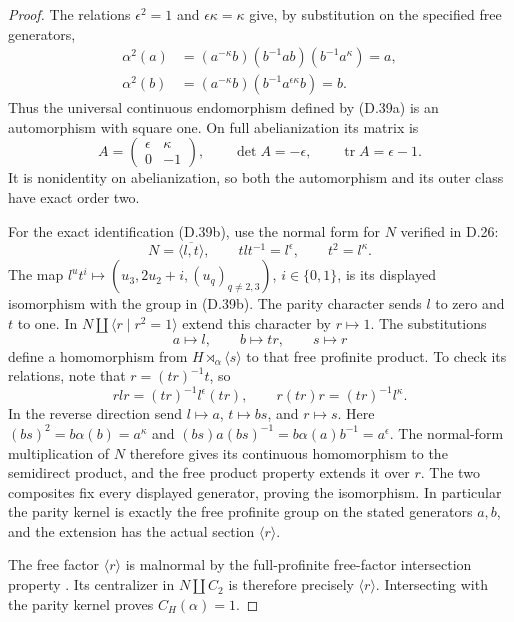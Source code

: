 \begin{proof}
The relations $\epsilon^2=1$ and
$\epsilon\kappa=\kappa$ give, by substitution
on the specified free generators,
\[
 \begin{split}
 \alpha^2(a)
  &=(a^{-\kappa}b)(b^{-1}ab)(b^{-1}a^\kappa)=a,\\
 \alpha^2(b)
  &=(a^{-\kappa}b)(b^{-1}a^{\epsilon\kappa}b)=b.
 \end{split}
\]
Thus the universal continuous endomorphism
defined by (D.39a) is an automorphism with
square one.
On full abelianization its matrix is
\[
       A=\begin{pmatrix}\epsilon&\kappa\\0&-1\end{pmatrix},
       \qquad \det A=-\epsilon,\qquad
       \operatorname{tr}A=\epsilon-1.                       \tag{D.39c}
\]
It is nonidentity on abelianization, so both
the automorphism and its outer class have
exact order two.

For the exact identification (D.39b), use
the normal form for $N$ verified in D.26:
\[
 N=\overline{\langle l,t\rangle},\qquad
 tlt^{-1}=l^\epsilon,\qquad t^2=l^\kappa.
\]
The map $l^u t^i\mapsto
(u_3,2u_2+i,(u_q)_{q\ne2,3})$, $i\in\{0,1\}$,
is its displayed isomorphism with the group
in (D.39b).  The parity character sends
$l$ to zero and $t$ to one.
In $N\amalg\langle r\mid r^2=1\rangle$
extend this character by $r\mapsto1$.
The substitutions
\[
             a\longmapsto l,\qquad
             b\longmapsto tr,\qquad
             s\longmapsto r
\]
define a homomorphism from
$H\rtimes_\alpha\langle s\rangle$ to that
free profinite product.  To check its
relations, note that $r=(tr)^{-1}t$,
so
\[
 rlr=(tr)^{-1}l^\epsilon(tr),\qquad
 r(tr)r=(tr)^{-1}l^\kappa.
\]
In the reverse direction send
$l\mapsto a$, $t\mapsto bs$, and $r\mapsto s$.
Here
$(bs)^2=b\alpha(b)=a^\kappa$ and
$(bs)a(bs)^{-1}=b\alpha(a)b^{-1}=a^\epsilon$.
The normal-form multiplication of $N$
therefore gives its continuous homomorphism
to the semidirect product, and the free
product property extends it over $r$.
The two composites fix every displayed
generator, proving the isomorphism.
In particular the parity kernel is exactly
the free profinite group on the stated
generators $a,b$, and the extension has
the actual section $\langle r\rangle$.

The free factor $\langle r\rangle$ is
malnormal by the full-profinite
free-factor intersection property
\cite[Theorem 5 of the inspected author
version]{A-HerfortZalesskii2008}.
Its centralizer in $N\amalg C_2$ is
therefore precisely $\langle r\rangle$.
Intersecting with the parity kernel
proves $C_H(\alpha)=1$.


\end{proof}
